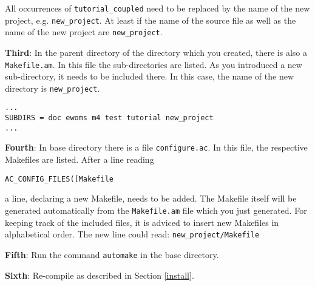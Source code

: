 All occurrences of \texttt{tutorial\_coupled} need to be replaced by
the name of the new project, e.g. \texttt{new\_project}. At least if
the name of the source file as well as the name of the new project are
\texttt{new\_project}.

\textbf{Third}: In the parent directory of the directory which you
created, there is also a \texttt{Makefile.am}. In this file the
sub-directories are listed. As you introduced a new sub-directory, it
needs to be included there. In this case, the name of the new
directory is \texttt{new\_project}.

\begin{verbatim}
...
SUBDIRS = doc ewoms m4 test tutorial new_project
...
\end{verbatim}

\textbf{Fourth}: In \eWoms base directory there is a file
\texttt{configure.ac}. In this file, the respective Makefiles are
listed. After a line reading

 \texttt{AC\_CONFIG\_FILES([Makefile} 

 \noindent a line, declaring a new Makefile, needs to be added. The
 Makefile itself will be generated automatically from the
 \texttt{Makefile.am} file which you just generated. For keeping track
 of the included files, it is adviced to insert new Makefiles in
 alphabetical order. The new line could read:
 \texttt{new\_project/Makefile}

 \textbf{Fifth}: Run the command \texttt{automake} in the \eWoms base
 directory.

 \textbf{Sixth}: Re-compile \eWoms as described in Section \ref{install}.





